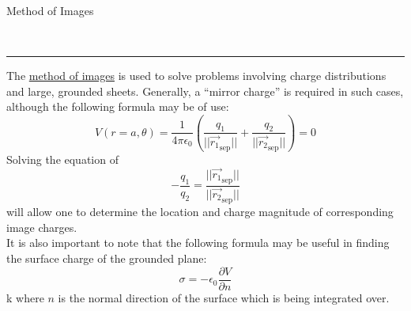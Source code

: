 \documentclass{article}
\newcommand{\header}[1]{\begin{large}\noindent #1\end{large}\\\rule{\textwidth}{0.5pt}}
\newcommand{\gap}{\medskip\\}
\begin{document}
\pagebreak

\header{Method of Images}
The \underline{method of images} is used to solve problems involving charge distributions
and large, grounded sheets. Generally, a ``mirror charge'' is required in such cases, 
although the following formula may be of use:
\[
    V(r = a, \theta) = \frac{1}{4\pi \epsilon_0} \left(\frac{q_1}{||\vec{r_1}_\textrm{sep}||} + \frac{q_2}{||\vec{r_2}_\textrm{sep}||}\right) = 0
\]
Solving the equation of
\[
    -\frac{q_1}{q_2} = \frac{||\vec{r_1}_\textrm{sep}||}{||\vec{r_2}_\textrm{sep}||}
\]
will allow one to determine the location and charge magnitude of corresponding image charges.
\gap
It is also important to note that the following formula may be useful in finding the 
surface charge of the grounded plane:
\[
    \sigma = - \epsilon_0 \frac{\partial V}{\partial n}
\]k
where $n$ is the normal direction of the surface which is being integrated over.
\end{document}

